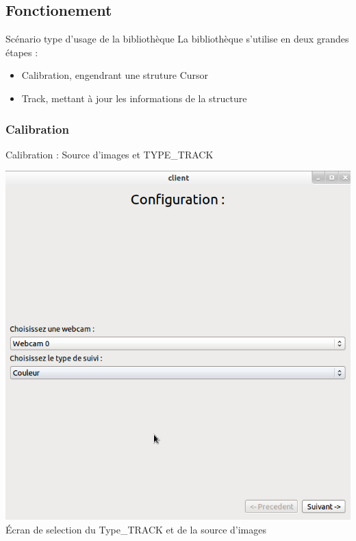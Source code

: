 \documentclass{beamer}
\begin{document}
		\subsection{Fonctionement}
		\begin{frame}{Scénario type d'usage de la bibliothèque}
			La bibliothèque s'utilise en deux grandes étapes :
			\begin{itemize}
				\item{Calibration, engendrant une struture Cursor}
				\item{Track, mettant à jour les informations de la structure}
			\end{itemize}
		\end{frame}

		\subsubsection{Calibration}
		\begin{frame}{Calibration : Source d'images et TYPE\_TRACK}
			\begin{center}
				\includegraphics[scale=0.25]{Capture6.png}\\
				Écran de selection du Type\_TRACK et de la source d'images
			\end{center}
		\end{frame}
\end{document}
